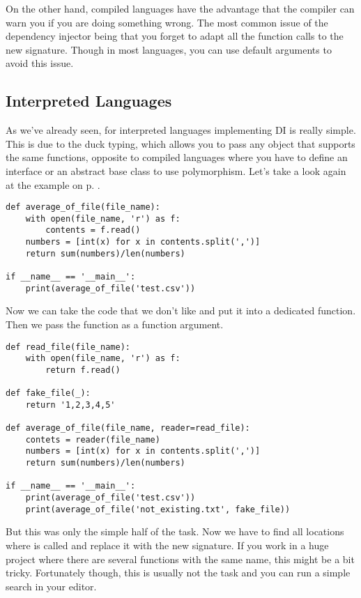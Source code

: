 On the other hand, compiled languages have the advantage that the compiler can warn you if you are doing something wrong. The most common issue of the dependency injector being that you forget to adapt all the function calls to the new signature. Though in most languages, you can use default arguments to avoid this issue.

\subsection{Interpreted Languages}

As we've already seen, for interpreted languages implementing DI is really simple. This is due to the duck typing, which allows you to pass any object that supports the same functions, opposite to compiled languages where you have to define an interface or an abstract base class to use polymorphism. Let's take a look again at the example on p. \pageref{prog:average_of_file}.

\begin{programcode}{}
\begin{verbatim}
def average_of_file(file_name):
    with open(file_name, 'r') as f:
        contents = f.read()
    numbers = [int(x) for x in contents.split(',')]
    return sum(numbers)/len(numbers)

if __name__ == '__main__':
    print(average_of_file('test.csv'))
\end{verbatim}
\end{programcode}

Now we can take the code that we don't like and put it into a dedicated function. Then we pass the function as a function argument.

\begin{programcode}{}
\begin{verbatim}
def read_file(file_name):
    with open(file_name, 'r') as f:
        return f.read()

def fake_file(_):
    return '1,2,3,4,5'

def average_of_file(file_name, reader=read_file):
    contets = reader(file_name)
    numbers = [int(x) for x in contents.split(',')]
    return sum(numbers)/len(numbers)

if __name__ == '__main__':
    print(average_of_file('test.csv'))
    print(average_of_file('not_existing.txt', fake_file))
\end{verbatim}
\end{programcode}

But this was only the simple half of the task. Now we have to find all locations where  is called and replace it with the new signature. If you work in a huge project where there are several functions with the same name, this might be a bit tricky. Fortunately though, this is usually not the task and you can run a simple search in your editor.

